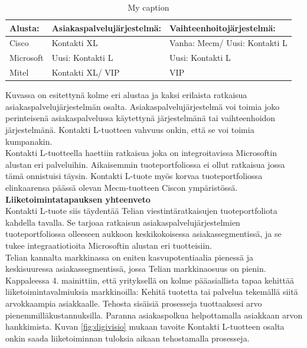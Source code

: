 \documentclass[finnish,12pt,a4paper,pdftex]{article}
\begin{document}
\begin{table}[]
\centering
\caption{My caption}
\label{my-label}
\begin{tabular}{|l|l|l|}
\hline

\textbf{Alusta:}    & \textbf{Asiakaspalvelujärjestelmä:} & \textbf{Vaihteenhoitojärjestelmä:}      \\ \hline
Cisco     & Kontakti XL               & Vanha: Mecm/ Uusi: Kontakti L \\ \hline
Microsoft & Uusi: Kontakti L          & Uusi: Kontakti L              \\ \hline
Mitel     & Kontakti XL/ VIP          & VIP                           \\ \hline
\end{tabular}
\end{table}

Kuvassa on esitettynä kolme eri alustaa ja kaksi erilaista ratkaisua asiakaspalvelujärjestelmän osalta. Asiakaspalvelujärjestelmä voi toimia joko perinteisenä asiakaspalvelussa käytettynä järjestelmänä tai vaihteenhoidon järjestelmänä. Kontakti L-tuotteen vahvuus onkin, että se voi toimia kumpanakin.\\

Kontakti L-tuotteella haettiin ratkaisua joka on integroitavissa Microsoftin alustan eri palveluihin. Aikaisemmin tuoteportfoliossa ei ollut ratkaisua jossa tämä onnistuisi täysin. Kontakti L-tuote myös korvaa tuoteportfoliossa elinkaarensa päässä olevan Mecm-tuotteen Ciscon ympäristössä.\\

\textbf{Liiketoimintatapauksen yhteenveto}\\

Kontakti L-tuote siis täydentää Telian viestintäratkaisujen tuoteportfoliota kahdella tavalla. Se tarjoaa ratkaisun asiakaspalvelujärjestelmien tuoteportfoliossa olleeseen aukkoon keskikokoisessa asiakassegmentissä, ja se tukee integraatiotioita Microsoftin alustan eri tuotteisiin.\\

Telian kannalta markkinassa on eniten kasvupotentiaalia pienessä ja keskisuuressa asiakassegmentissä, jossa Telian markkinaosuus on pienin. Kappaleessa 4. mainittiin, että yrityksellä on kolme pääasiallista tapaa kehittää liiketoimintavalmiuksia markkinoilla: Kehitä tuotetta tai palvelua tekemällä siitä arvokkaampia asiakkaalle. Tehosta sisäisiä prosesseja tuottaaksesi arvo pienemmilläkustannuksilla. Paranna asiakaspolkua helpottamalla asiakkaan arvon hankkimista. Kuvan \ref{fig:digivisio} mukaan tavoite Kontakti L-tuotteen osalta onkin saada liiketoiminnan tuloksia aikaan tehostamalla prosesseja.
\end{document}
